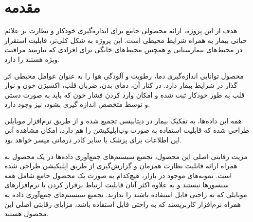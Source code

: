 \chapter{مقدمه}

هدف از این پروژه، ارائه محصولی جامع برای اندازه‌گیری خودکار و نظارت بر علائم حیاتی بیمار به همراه شرایط محیطی است. این پروژه به شکل کلی‌تر، قابلیت استقرار در محیط‌های بیمارستانی و همچنین محیط‌های خانگی برای افرادی که نیازمند مراقبت ویژه هستند را دارد.

محصول توانایی اندازه‌گیری دما،‌ رطوبت و آلودگی هوا را به عنوان عوامل محیطی اثر گذار در شرایط بیمار دارد. در کنار آن، دمای بدن، ضربان قلب، اکسیژن خون و نوار قلب به طور خودکار ثبت شده و امکان وارد کردن فشار خون که باید به صورت دستی و توسط متخصص اندازه گیری بشود، نیز وجود دارد.

همه این داده‌ها، به تفکیک بیمار در دیتابیسی تجمیع شده و از طریق نرم‌افزار موبایلی طراحی شده که قابلیت استفاده به صورت وب‌اپلیکیشن‌ را هم دارد، امکان مشاهده آنی این اطلاعات برای پزشک یا سایر کادر درمانی میسر خواهد بود.

مزیت رقابتی اصلی این محصول،‌ تجمیع سیستم‌های جمع‌آوری داده‌ها در یک محصول به همراه ارائه قابلیت نظارت همزمان و گزارش‌گیری از طریق اپلیکیشن طراحی شده است. نمونه‌های موجود در بازار، هیچ‌کدام به صورت یک محصول جامع شامل همه سنسورها نیستند و به علاوه اکثر آنان قابلیت ارتباط برقرار کردن با نرم‌افزارهای موبایلی که به راحتی قابل استفاده باشند را ندارند. تجمیع سیستم‌های جمع‌آوری داده به همراه نرم‌افزار کاربرپسند که به راحتی قابل استفاده باشد،‌ مزایای رقابتی اصلی این محصول هستند.
